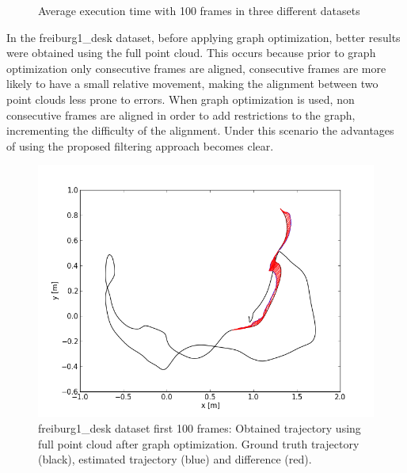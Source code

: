 \begin{center}
\begin{figure}
\caption{Average execution time with 100 frames in three different datasets} 
\end{figure}
\end{center}

In the freiburg1\_desk dataset, before applying graph optimization, better results were obtained using 
the full point cloud. This occurs because prior to graph optimization only consecutive frames are aligned, 
consecutive frames are more likely to have a small relative movement, making the alignment between two point clouds 
less prone to 
errors. When graph optimization is used, non consecutive frames are aligned in order to add restrictions to the graph, 
incrementing the difficulty of 
the alignment. Under this scenario the advantages of using the proposed filtering approach becomes clear.


\begin{figure}[H]
\begin{center}
\includegraphics[scale=0.75]{images/freiburg1_desk_1_100_fullcloud_optimized.png}
\caption{freiburg1\_desk dataset first 100 frames: Obtained trajectory using full point cloud after graph optimization. Ground truth trajectory (black), estimated trajectory (blue) and difference (red).}
\end{center}
\end{figure}

